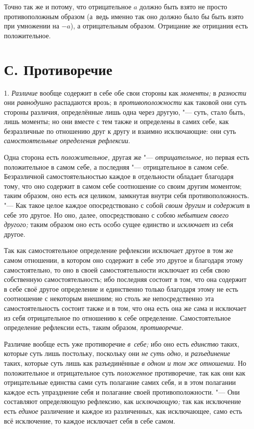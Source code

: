Точно так же и потому, что отрицательное $a$ должно
быть взято не просто противоположным образом (а~ведь именно так оно должно
было бы быть взято при умножении на $-a$), а
отрицательным образом. Отрицание же отрицания есть положительное.

\section[С. Противоречие]{С. Противоречие}
1. {\em Различие} вообще содержит в себе обе свои стороны
как {\em моменты;} в {\em разности} они {\em равнодушно}
распадаются врозь; в {\em противоположности} как
таковой они суть стороны различия, определённые лишь одна через другую, "---
суть, стало быть, лишь моменты; но они вместе с тем также и определены в
самих себе, как безразличные по отношению друг к другу и взаимно
исключающие: они суть {\em самостоятельные определения рефлексии}.

Одна сторона есть {\em положительное,} другая же
"--- {\em отрицательное,} но первая есть положительное в
самом себе, а последняя "--- отрицательное в самом себе. Безразличной
самостоятельностью каждое в отдельности обладает благодаря тому, что оно
содержит в самом себе соотношение со своим другим моментом; таким образом,
оно есть {\em вся} целиком, замкнутая внутри себя
противоположность. "--- Как такое целое каждое опосредствовано с собой
{\em своим другим} и {\em содержит}
в себе это другое. Но оно, далее, опосредствовано с собою
{\em небытием своего другого;} таким образом оно есть
особо сущее единство и {\em исключает} из себя другое.

Так как самостоятельное определение рефлексии исключает другое в том же
самом отношении, в котором оно содержит в себе это другое и благодаря этому
самостоятельно, то оно в своей самостоятельности исключает из себя свою
собственную самостоятельность; ибо последняя состоит в том, что она
содержит в себе своё другое определение и единственно только благодаря
этому не есть соотношение с некоторым внешним; но столь же непосредственно
эта самостоятельность состоит также и в том, что она есть она же сама и
исключает из себя отрицательное по отношению к себе определение.
Самостоятельное определение рефлексии есть, таким образом, {\em противоречие}.

Различие вообще есть уже противоречие {\em в~себе;} ибо
оно есть {\em единство} таких, которые суть лишь
постольку, поскольку они {\em не суть одно,} и
{\em разъединение} таких, которые суть лишь как
разъединённые {\em в одном и том же отношении}. Но
положительное и отрицательное суть {\em положенное}
противоречие, так как они как отрицательные единства сами суть полагание
самих себя, и в этом полагании каждое есть упразднение себя и полагание
своей противоположности. "--- Они составляют определяющую рефлексию, как
{\em исключающую;} так как исключение есть
{\em единое} различение и каждое из различенных, как
исключающее, само есть всё исключение, то каждое исключает себя в себе самом.

